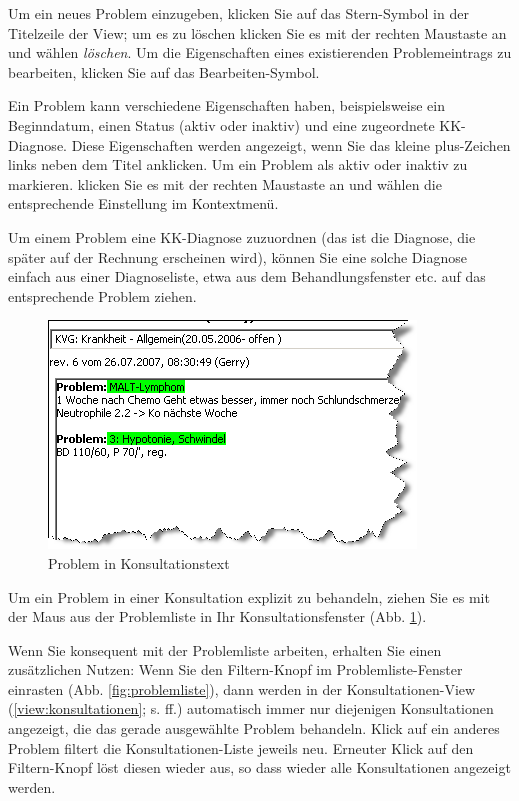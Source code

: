 Um ein neues Problem einzugeben, klicken Sie auf das Stern-Symbol in der Titelzeile der View; um es zu löschen klicken Sie es mit der rechten Maustaste an und wählen \textit{löschen}. Um die Eigenschaften eines existierenden Problemeintrags zu bearbeiten, klicken Sie auf das Bearbeiten-Symbol.

Ein Problem kann verschiedene Eigenschaften haben, beispielsweise ein Beginndatum, einen Status (aktiv oder inaktiv) und eine zugeordnete KK-Diagnose. Diese Eigenschaften werden angezeigt, wenn Sie das kleine plus-Zeichen links neben dem Titel anklicken. Um ein Problem als aktiv oder inaktiv zu markieren. klicken Sie es mit der rechten Maustaste an und wählen die entsprechende Einstellung im Kontextmenü.

Um einem Problem eine KK-Diagnose zuzuordnen (das ist die Diagnose, die später auf der Rechnung erscheinen wird), können Sie eine solche Diagnose einfach aus einer Diagnoseliste, etwa aus dem Behandlungsfenster etc. auf das entsprechende Problem ziehen.

\begin{figure}[ht]
    \includegraphics{images/problemliste2}
    \caption{Problem in Konsultationstext}
    \label{fig:problemliste2}
\end{figure}
Um ein Problem in einer Konsultation explizit zu behandeln, ziehen Sie es mit der Maus aus der Problemliste in Ihr Konsultationsfenster (Abb. \ref{fig:problemliste2}).

Wenn Sie konsequent mit der Problemliste arbeiten, erhalten Sie einen zusätzlichen Nutzen: Wenn Sie den Filtern-Knopf im Problemliste-Fenster einrasten (Abb. \ref{fig:problemliste}), dann werden in der Konsultationen-View (\ref{view:konsultationen}; s. \pageref{view:konsultationen} ff.) automatisch immer nur diejenigen Konsultationen angezeigt, die das gerade ausgewählte Problem behandeln. 
\label{filter:problemliste}
 Klick auf ein anderes Problem filtert die Konsultationen-Liste jeweils neu. Erneuter Klick auf den Filtern-Knopf löst diesen wieder aus, so dass wieder alle Konsultationen angezeigt werden.

